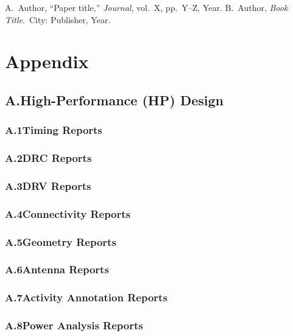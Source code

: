 \documentclass[conference]{IEEEtran}
\begin{document}
\newpage
\onecolumn
\begin{thebibliography}{00}
 {A.\ Author, ``Paper title,'' \textit{Journal},
  vol.~X, pp.~Y--Z, Year.}
 {B.\ Author, \textit{Book Title}.\ City:
  Publisher, Year.}
\end{thebibliography}

\section*{Appendix}

\subsection*{A.\quad \textcolor{hpcolor}{High-Performance (HP) Design}}\label{app:hp}

\subsubsection*{A.1\quad Timing Reports}\label{app:hp:timing}
\subsubsection*{A.2\quad DRC Reports}\label{app:hp:drc}
\subsubsection*{A.3\quad DRV Reports}\label{app:hp:drv}
\subsubsection*{A.4\quad Connectivity Reports}\label{app:hp:conn}
\subsubsection*{A.5\quad Geometry Reports}\label{app:hp:geom}
\subsubsection*{A.6\quad Antenna Reports}\label{app:hp:antenna}
\subsubsection*{A.7\quad Activity Annotation Reports}\label{app:hp:annotation}
\subsubsection*{A.8\quad Power Analysis Reports}\label{app:hp:power}
\end{document}
